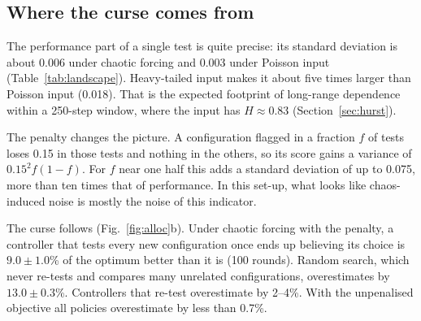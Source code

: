 \documentclass[11pt,a4paper]{article}
\begin{document}
\begin{table}[t]
\caption{The exhaustively computed landscapes (16 runs of 400 steps per configuration). ``Flagged'': the short-window indicator exceeds 0.05 in more than half of the runs. ``Unstable'': the model exponent is positive in more than half of the runs. SD: median standard deviation of one 250-step performance score.}
\label{tab:landscape}
\centering\small
{}
\end{table}

\subsection{Where the curse comes from}
\label{sec:curse}

The performance part of a single test is quite precise: its standard deviation is about 0.006 under chaotic forcing and 0.003 under Poisson input (Table~\ref{tab:landscape}). Heavy-tailed input makes it about five times larger than Poisson input (0.018). That is the expected footprint of long-range dependence within a 250-step window, where the input has $H\approx0.83$ (Section~\ref{sec:hurst}).

The penalty changes the picture. A configuration flagged in a fraction $f$ of tests loses 0.15 in those tests and nothing in the others, so its score gains a variance of $0.15^2 f(1-f)$. For $f$ near one half this adds a standard deviation of up to 0.075, more than ten times that of performance. In this set-up, what looks like chaos-induced noise is mostly the noise of this indicator.

The curse follows (Fig.~\ref{fig:alloc}b). Under chaotic forcing with the penalty, a controller that tests every new configuration once ends up believing its choice is $9.0\pm1.0$\% of the optimum better than it is (100 rounds). Random search, which never re-tests and compares many unrelated configurations, overestimates by $13.0\pm0.3$\%. Controllers that re-test overestimate by 2--4\%. With the unpenalised objective all policies overestimate by less than 0.7\%.
\end{document}
